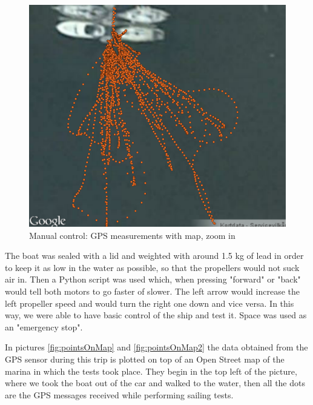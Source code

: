 \begin{figure}[htpb]
	\begin{center}
		\includegraphics[width=\textwidth]{img/maidenVoyage/pointsOnMapZoom}
		\caption{Manual control: GPS measurements with map, zoom in} 
		\label{fig:pointsOnMap2}
	\end{center}
\end{figure}

The boat was sealed with a lid and weighted with around 1.5 kg of lead in order to keep it as low in the water as possible, so that the propellers would not suck air in. Then a Python script was used which, when pressing "forward" or "back" would tell both motors to go faster of slower. The left arrow would increase the left propeller speed and would turn the right one down and vice versa. In this way, we were able to have basic control of the ship and test it. Space was used as an "emergency stop".

In pictures \vref{fig:pointsOnMap} and \vref{fig:pointsOnMap2} the data obtained from the GPS sensor during this trip is plotted on top of an Open Street map of the marina in which the tests took place. They begin in the top left of the picture, where we took the boat out of the car and walked to the water, then all the dots are the GPS messages received while performing sailing tests.


